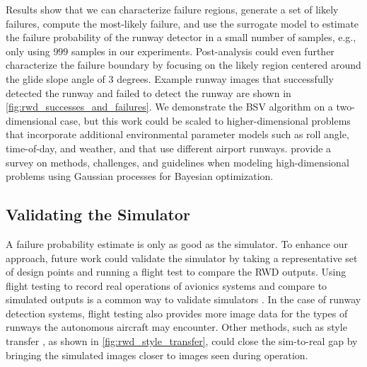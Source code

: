 Results show that we can characterize failure regions, generate a set of likely failures, compute the most-likely failure, and use the surrogate model to estimate the failure probability of the runway detector in a small number of samples, e.g., only using $999$ samples in our experiments.
Post-analysis could even further characterize the failure boundary by focusing on the likely region centered around the glide slope angle of $3$ degrees.
Example runway images that successfully detected the runway and failed to detect the runway are shown in \cref{fig:rwd_successes_and_failures}.
We demonstrate the BSV algorithm on a two-dimensional case, but this work could be scaled to higher-dimensional problems that incorporate additional environmental parameter models such as roll angle, time-of-day, and weather, and that use different airport runways.
\textcite{binois2022survey} provide a survey on methods, challenges, and guidelines when modeling high-dimensional problems using Gaussian processes for Bayesian optimization.

\subsection{Validating the Simulator}
A failure probability estimate is only as good as the simulator.
To enhance our approach, future work could validate the simulator by taking a representative set of design points and running a flight test to compare the RWD outputs. 
Using flight testing to record real operations of avionics systems and compare to simulated outputs is a common way to validate simulators \cite{gregory2021introduction}.
In the case of runway detection systems, flight testing also provides more image data for the types of runways the autonomous aircraft may encounter.
Other methods, such as style transfer \cite{gatys2016image,johnson2016perceptual}, as shown in \cref{fig:rwd_style_transfer}, could close the sim-to-real gap \cite{ruter2024investigating} by bringing the simulated images closer to images seen during operation.


